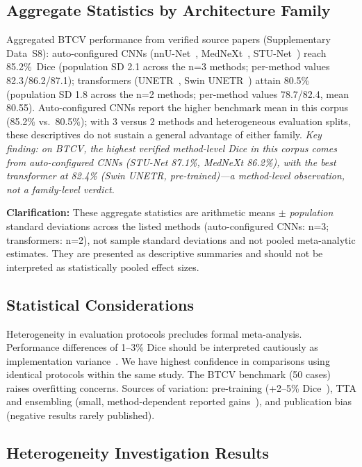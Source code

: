 \subsection{Aggregate Statistics by Architecture Family}

Aggregated BTCV performance from verified source papers (Supplementary Data~S8): auto-configured CNNs (nnU-Net~\cite{isensee2021nnunet}, MedNeXt~\cite{roy2023mednext}, STU-Net~\cite{huang2023stunet}) reach 85.2\%~Dice (population SD 2.1 across the n=3 methods; per-method values 82.3/86.2/87.1); transformers (UNETR~\cite{hatamizadeh2022unetr}, Swin UNETR~\cite{swinunetr2022}) attain 80.5\% (population SD 1.8 across the n=2 methods; per-method values 78.7/82.4, mean 80.55). Auto-configured CNNs report the higher benchmark mean in this corpus (85.2\% vs.\ 80.5\%); with 3 versus 2 methods and heterogeneous evaluation splits, these descriptives do not sustain a general advantage of either family. \emph{Key finding: on BTCV, the highest verified method-level Dice in this corpus comes from auto-configured CNNs (STU-Net 87.1\%, MedNeXt 86.2\%), with the best transformer at 82.4\% (Swin UNETR, pre-trained)---a method-level observation, not a family-level verdict.}

\textbf{Clarification:} These aggregate statistics are arithmetic means $\pm$ \emph{population} standard deviations across the listed methods (auto-configured CNNs: n=3; transformers: n=2), not sample standard deviations and not pooled meta-analytic estimates. They are presented as descriptive summaries and should not be interpreted as statistically pooled effect sizes.

\subsection{Statistical Considerations}

Heterogeneity in evaluation protocols precludes formal meta-analysis. Performance differences of 1--3\% Dice should be interpreted cautiously as implementation variance~\cite{isensee2021nnunet}. We have highest confidence in comparisons using identical protocols within the same study. The BTCV benchmark (50 cases) raises overfitting concerns. Sources of variation: pre-training (+2--5\% Dice~\cite{swinunetr2022}), TTA and ensembling (small, method-dependent reported gains~\cite{isensee2021nnunet}), and publication bias (negative results rarely published).

\subsection{Heterogeneity Investigation Results}

